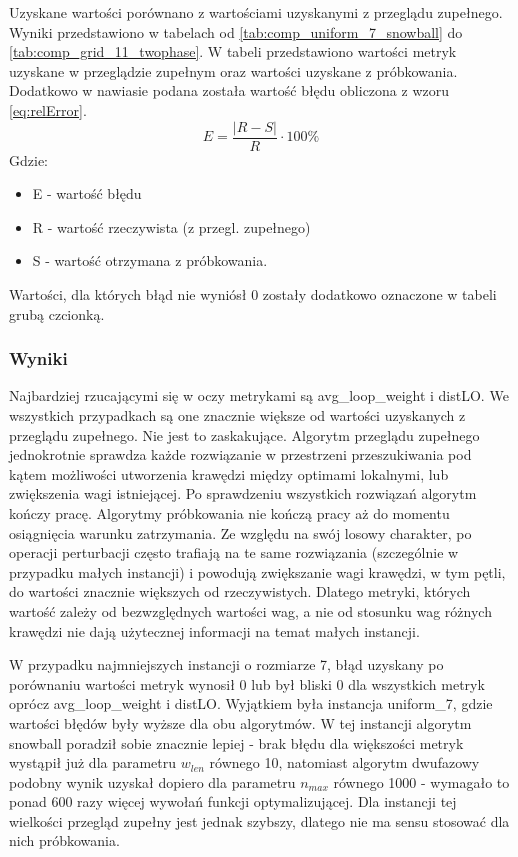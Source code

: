 Uzyskane wartości porównano z wartościami uzyskanymi z przeglądu zupełnego.
Wyniki przedstawiono w tabelach od \ref{tab:comp_uniform_7_snowball} do \ref{tab:comp_grid_11_twophase}.
W tabeli przedstawiono wartości metryk uzyskane w przeglądzie zupełnym oraz wartości uzyskane z próbkowania.
Dodatkowo w nawiasie podana została wartość błędu obliczona z wzoru \ref{eq:relError}.
\begin{equation}
    \label{eq:relError}
    E = \frac{|R - S|}{R} \cdot 100\%
\end{equation}
Gdzie:
\begin{itemize}
    \item E - wartość błędu
    \item R - wartość rzeczywista (z przegl. zupełnego)
    \item S - wartość otrzymana z próbkowania.
\end{itemize}

Wartości, dla których błąd nie wyniósł 0 zostały dodatkowo oznaczone w tabeli grubą czcionką.

\subsubsection{Wyniki}



Najbardziej rzucającymi się w oczy metrykami są avg\_loop\_weight i distLO.
We wszystkich przypadkach są one znacznie większe od wartości uzyskanych z przeglądu zupełnego.
Nie jest to zaskakujące. Algorytm przeglądu zupełnego jednokrotnie sprawdza każde rozwiązanie w przestrzeni przeszukiwania pod kątem
możliwości utworzenia krawędzi między optimami lokalnymi, lub zwiększenia wagi istniejącej.
Po sprawdzeniu wszystkich rozwiązań algorytm kończy pracę.
Algorytmy próbkowania nie kończą pracy aż do momentu osiągnięcia warunku zatrzymania.
Ze względu na swój losowy charakter, po operacji perturbacji często trafiają na te same rozwiązania
(szczególnie w przypadku małych instancji) i powodują zwiększanie wagi krawędzi, w tym pętli, do wartości znacznie większych od rzeczywistych.
Dlatego metryki, których wartość zależy od bezwzględnych wartości wag, a nie od stosunku wag różnych krawędzi nie dają użytecznej informacji na temat małych instancji.

W przypadku najmniejszych instancji o rozmiarze 7, błąd uzyskany po porównaniu wartości metryk
wynosił 0 lub był bliski 0 dla wszystkich metryk oprócz avg\_loop\_weight i distLO.
Wyjątkiem była instancja uniform\_7, gdzie wartości błędów były wyższe dla obu algorytmów.
W tej instancji algorytm snowball poradził sobie znacznie lepiej - brak błędu dla większości
metryk wystąpił już dla parametru $w_{len}$ równego 10, natomiast algorytm dwufazowy
podobny wynik uzyskał dopiero dla parametru $n_{max}$ równego 1000 - wymagało to ponad 600 razy więcej wywołań funkcji optymalizującej.
Dla instancji tej wielkości przegląd zupełny jest jednak szybszy, dlatego nie ma sensu stosować dla nich próbkowania.

